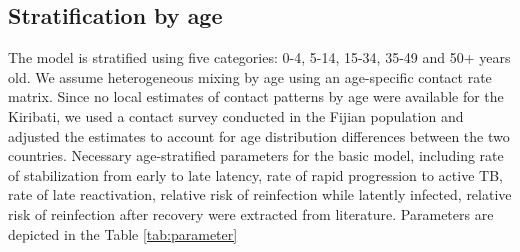 \subsection{Stratification by age}


The model is stratified using five categories: 0-4, 5-14, 15-34, 35-49 and 50+ years old. We assume 
heterogeneous mixing by age using an age-specific contact rate matrix. Since no local estimates of 
contact patterns by age were available for the Kiribati, we used a contact survey conducted in 
the Fijian population \cite{watson-2017} and adjusted the estimates to account for age distribution differences between
the two countries. Necessary age-stratified parameters for the basic model, including rate of stabilization from early to late latency,
rate of rapid progression to active TB, rate of late reactivation, relative risk of reinfection while latently infected, 
relative risk of reinfection after recovery were extracted from literature. Parameters are depicted in the Table \ref{tab:parameter}

